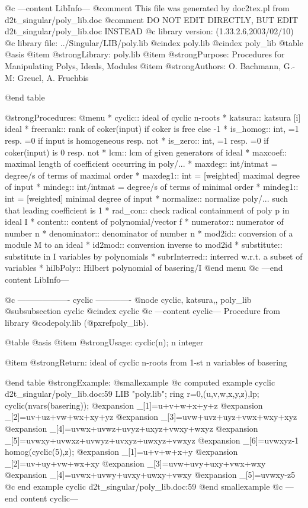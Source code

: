 @c ---content LibInfo---
@comment This file was generated by doc2tex.pl from d2t_singular/poly_lib.doc
@comment DO NOT EDIT DIRECTLY, BUT EDIT d2t_singular/poly_lib.doc INSTEAD
@c library version: (1.33.2.6,2003/02/10)
@c library file: ../Singular/LIB/poly.lib
@cindex poly.lib
@cindex poly_lib
@table @asis
@item @strong{Library:}
poly.lib
@item @strong{Purpose:}
      Procedures for Manipulating Polys, Ideals, Modules
@item @strong{Authors:}
O. Bachmann, G.-M: Greuel, A. Fruehbis

@end table

@strong{Procedures:}
@menu
* cyclic:: ideal of cyclic n-roots
* katsura:: katsura [i] ideal
* freerank:: rank of coker(input) if coker is free else -1
* is_homog:: int, =1 resp. =0 if input is homogeneous resp. not
* is_zero:: int, =1 resp. =0 if coker(input) is 0 resp. not
* lcm:: lcm of given generators of ideal
* maxcoef:: maximal length of coefficient occurring in poly/...
* maxdeg:: int/intmat = degree/s of terms of maximal order
* maxdeg1:: int = [weighted] maximal degree of input
* mindeg:: int/intmat = degree/s of terms of minimal order
* mindeg1:: int = [weighted] minimal degree of input
* normalize:: normalize poly/... such that leading coefficient is 1
* rad_con:: check radical containment of poly p in ideal I
* content:: content of polynomial/vector f
* numerator:: numerator of number n
* denominator:: denominator of number n
* mod2id:: conversion of a module M to an ideal
* id2mod:: conversion inverse to mod2id
* substitute:: substitute in I variables by polynomials
* subrInterred:: interred w.r.t. a subset of variables
* hilbPoly:: Hilbert polynomial of basering/I
@end menu
@c ---end content LibInfo---

@c ------------------- cyclic -------------
@node cyclic, katsura,, poly_lib
@subsubsection cyclic
@cindex cyclic
@c ---content cyclic---
Procedure from library @code{poly.lib} (@pxref{poly_lib}).

@table @asis
@item @strong{Usage:}
cyclic(n); n integer

@item @strong{Return:}
ideal of cyclic n-roots from 1-st n variables of basering

@end table
@strong{Example:}
@smallexample
@c computed example cyclic d2t_singular/poly_lib.doc:59 
LIB "poly.lib";
ring r=0,(u,v,w,x,y,z),lp;
cyclic(nvars(basering));
@expansion{} _[1]=u+v+w+x+y+z
@expansion{} _[2]=uv+uz+vw+wx+xy+yz
@expansion{} _[3]=uvw+uvz+uyz+vwx+wxy+xyz
@expansion{} _[4]=uvwx+uvwz+uvyz+uxyz+vwxy+wxyz
@expansion{} _[5]=uvwxy+uvwxz+uvwyz+uvxyz+uwxyz+vwxyz
@expansion{} _[6]=uvwxyz-1
homog(cyclic(5),z);
@expansion{} _[1]=u+v+w+x+y
@expansion{} _[2]=uv+uy+vw+wx+xy
@expansion{} _[3]=uvw+uvy+uxy+vwx+wxy
@expansion{} _[4]=uvwx+uvwy+uvxy+uwxy+vwxy
@expansion{} _[5]=uvwxy-z5
@c end example cyclic d2t_singular/poly_lib.doc:59
@end smallexample
@c ---end content cyclic---

